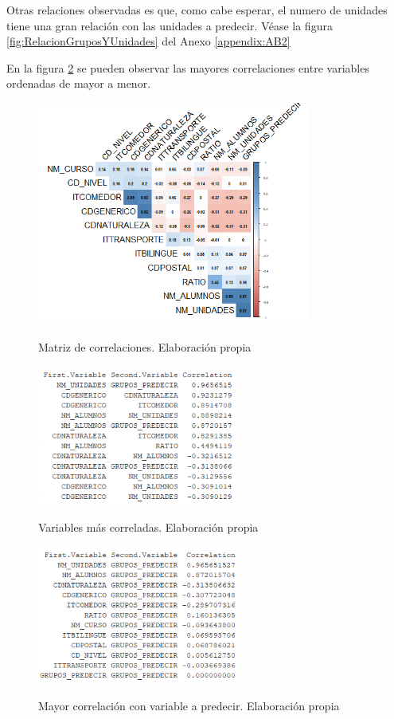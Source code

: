 Otras relaciones observadas es que, como cabe esperar, el numero de unidades tiene una gran relación con las unidades a predecir. Véase la figura \ref{fig:RelacionGruposYUnidades} del Anexo \ref{appendix:AB2}

En la figura \ref{fig:mayorescorrelaciones} se pueden observar las mayores correlaciones entre variables ordenadas de mayor a menor.

\begin{figure}[htb]
	\centering
	\caption{Matriz de correlaciones. Elaboración propia}
	\includegraphics[width=0.8\textwidth]{recursos/ImagenesR/matrizcorrelacion}
	\label{fig:matrizcorrelaciones}
\end{figure}

\begin{figure}[htb]
	\centering
	\caption{Variables más correladas. Elaboración propia}
	\includegraphics[width=0.6\textwidth]{recursos/ImagenesR/mayorescorrelaciones}
	\label{fig:mayorescorrelaciones}
\end{figure}


\begin{figure}[htb]
	\centering
	\caption{Mayor correlación con variable a predecir. Elaboración propia}
	\includegraphics[width=0.6\textwidth]{recursos/ImagenesR/mayorcorrelacion}
	\label{fig:mayorcorrelacionpredecir}
\end{figure}


